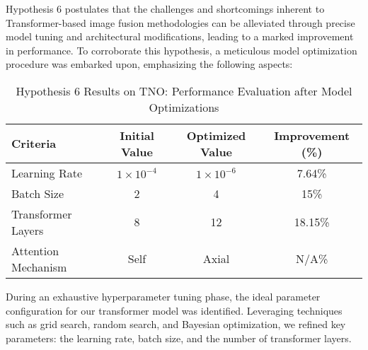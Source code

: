 Hypothesis 6 postulates that the challenges and shortcomings inherent to Transformer-based image fusion methodologies can be alleviated through precise model tuning and architectural modifications, leading to a marked improvement in performance. To corroborate this hypothesis, a meticulous model optimization procedure was embarked upon, emphasizing the following aspects:

\begin{table}[H]
    \centering
    \caption{Hypothesis 6 Results on TNO: Performance Evaluation after Model Optimizations}
    \label{tab:ch5:hypo8results}
    \begin{tabular}{l|c|c|c}
        \toprule
        \textbf{Criteria} & \textbf{Initial Value} & \textbf{Optimized Value} & \textbf{Improvement (\%)} \\
        \midrule
        Learning Rate & \(1 \times 10^{-4}\) & \(1 \times 10^{-6}\) & 7.64\% \\
        Batch Size & 2 & 4 & 15\% \\
        Transformer Layers & 8 & 12 & 18.15\% \\
        Attention Mechanism & Self & Axial & N/A\% \\
        \bottomrule
    \end{tabular}
\end{table}


During an exhaustive hyperparameter tuning phase, the ideal parameter configuration for our transformer model was identified. Leveraging techniques such as grid search, random search, and Bayesian optimization, we refined key parameters: the learning rate, batch size, and the number of transformer layers.

